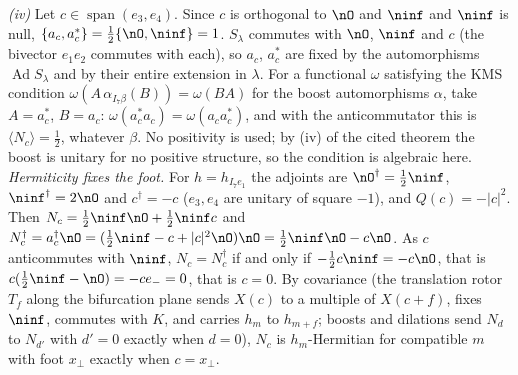 \emph{(iv)} Let $c \in \operatorname{span}(e_{3}, e_{4})$. Since $c$ is orthogonal to $\nO$ and $\ninf$ and $\ninf$ is null, $\{a_{c}, a_{c}^{*}\} = \tfrac12\{\nO, \ninf\} = 1$. $S_{\lambda}$ commutes with $\nO$, $\ninf$ and $c$ (the bivector $e_{1}e_{2}$ commutes with each), so $a_{c}$, $a_{c}^{*}$ are fixed by the automorphisms $\operatorname{Ad}S_{\lambda}$ and by their entire extension in $\lambda$. For a functional $\omega$ satisfying the KMS condition $\omega(A\,\alpha_{I_{7}\beta}(B)) = \omega(BA)$ for the boost automorphisms $\alpha$, take $A = a_{c}^{*}$, $B = a_{c}$: $\omega(a_{c}^{*}a_{c}) = \omega(a_{c}a_{c}^{*})$, and with the anticommutator this is $\langle N_{c}\rangle = \tfrac12$, whatever $\beta$. No positivity is used; by (iv) of the cited theorem the boost is unitary for no positive structure, so the condition is algebraic here.
\emph{Hermiticity fixes the foot.} For $h = h_{I_{7}e_{1}}$ the adjoints are $\nO^{\dagger} = \tfrac12\ninf$, $\ninf^{\dagger} = 2\nO$ and $c^{\dagger} = -c$ ($e_{3}, e_{4}$ are unitary of square $-1$), and $Q(c) = -|c|^{2}$. Then $N_{c} = \tfrac12\ninf\nO + \tfrac12\ninf c$ and $N_{c}^{\dagger} = a_{c}^{\dagger}\nO = (\tfrac12\ninf - c + |c|^{2}\nO)\nO = \tfrac12\ninf\nO - c\nO$. As $c$ anticommutes with $\ninf$, $N_{c} = N_{c}^{\dagger}$ if and only if $-\tfrac12 c\ninf = -c\nO$, that is $c(\tfrac12\ninf - \nO) = -ce_{-} = 0$, that is $c = 0$. By covariance (the translation rotor $T_{f}$ along the bifurcation plane sends $X(c)$ to a multiple of $X(c + f)$, fixes $\ninf$, commutes with $K$, and carries $h_{m}$ to $h_{m + f}$; boosts and dilations send $N_{d}$ to $N_{d'}$ with $d' = 0$ exactly when $d = 0$), $N_{c}$ is $h_{m}$-Hermitian for compatible $m$ with foot $x_{\perp}$ exactly when $c = x_{\perp}$.
